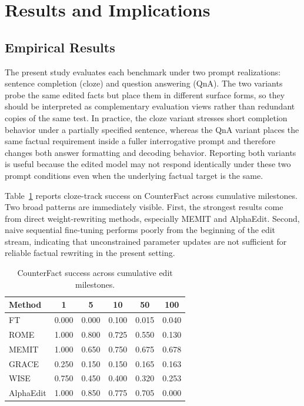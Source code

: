 \section{Results and Implications}

\subsection{Empirical Results}

The present study evaluates each benchmark under two prompt realizations: sentence completion (cloze) and question answering (QnA). The two variants probe the same edited facts but place them in different surface forms, so they should be interpreted as complementary evaluation views rather than redundant copies of the same test. In practice, the cloze variant stresses short completion behavior under a partially specified sentence, whereas the QnA variant places the same factual requirement inside a fuller interrogative prompt and therefore changes both answer formatting and decoding behavior. Reporting both variants is useful because the edited model may not respond identically under these two prompt conditions even when the underlying factual target is the same.

Table~\ref{tab:cfact_success} reports cloze-track success on CounterFact across cumulative milestones. Two broad patterns are immediately visible. First, the strongest results come from direct weight-rewriting methods, especially MEMIT and AlphaEdit. Second, naive sequential fine-tuning performs poorly from the beginning of the edit stream, indicating that unconstrained parameter updates are not sufficient for reliable factual rewriting in the present setting.

\begin{table}[H]
    \centering
    \caption{CounterFact success across cumulative edit milestones.}
    \label{tab:cfact_success}
    \begin{tabular}{lccccc}
        \toprule
        Method & 1 & 5 & 10 & 50 & 100 \\
        \midrule
        FT & 0.000 & 0.000 & 0.100 & 0.015 & 0.040 \\
        ROME & 1.000 & 0.800 & 0.725 & 0.550 & 0.130 \\
        MEMIT & 1.000 & 0.650 & 0.750 & 0.675 & 0.678 \\
        GRACE & 0.250 & 0.150 & 0.150 & 0.165 & 0.163 \\
        WISE & 0.750 & 0.450 & 0.400 & 0.320 & 0.253 \\
        AlphaEdit & 1.000 & 0.850 & 0.775 & 0.705 & 0.000 \\
        \bottomrule
    \end{tabular}
\end{table}

